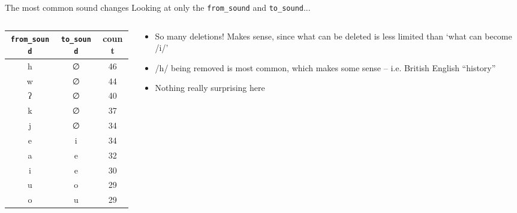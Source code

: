 \documentclass[10pt]{beamer}
\begin{document}
  \begin{frame}[fragile=singleslide]{The most common sound changes}
    Looking at only the \verb|from_sound| and \verb|to_sound|... 
    \begin{columns}[c]
      \begin{column}{0.5\textwidth}
        \begin{table}
          \begin{center}
            \begin{tabular}{|c|c|c|}
              \hline
              \small \verb|from_sound| & \small \verb|to_sound| & \small \textbf{count} \\
              \hline
              h & ∅ & 46 \\
              w & ∅ & 44 \\
              ʔ & ∅ & 40 \\
              k & ∅ & 37 \\
              j & ∅ & 34 \\
              e & i & 34 \\
              a & e & 32 \\
              i & e & 30 \\
              u & o & 29 \\
              o & u & 29 \\
              \hline
            \end{tabular}
          \end{center}
        \end{table}
      \end{column}
      \begin{column}{0.5\textwidth}
        \begin{itemize}
          \item So many deletions! Makes sense, since what can be deleted is less limited than `what can become /i/'
          \item /h/ being removed is most common, which makes some sense -- i.e. British English ``history''
          \item Nothing really surprising here
        \end{itemize}
      \end{column}
    \end{columns}
  \end{frame}
\end{document}
